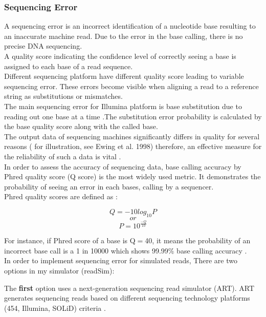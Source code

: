 \documentclass[11pt,a4paper]{report}
\begin{document}
 

\subsubsection{Sequencing Error} \label{Sequencing Error}
 

A sequencing error is an incorrect identification of a nucleotide base resulting 
to an inaccurate machine read. Due to the error in the base calling, there is no 
precise DNA sequencing. \\
A quality score indicating the confidence level of correctly seeing a base is 
assigned to each base of a read sequence.\\
Different sequencing platform have different quality score leading to variable 
sequencing error. These errors become visible when aligning a read to a reference 
string as substitutions or mismatches.\\
The main sequencing error for Illumina platform is base substitution due to 
reading out one base at a time \cite{art}.The substitution error probability is 
calculated by the base quality score along with the called base.\\

The output data of sequencing machines significantly differs in quality for 
several reasons ( for illustration, see Ewing et al. 1998) therefore, an effective 
measure for the reliability of such a data is vital \cite{phred1}.\\

In order to assess the accuracy of sequencing data, base calling accuracy by Phred 
quality score (Q score) is the most widely used metric. It demonstrates the probability 
of seeing an error in each bases, calling by a sequencer.\\

Phred quality scores are defined as \cite{phred2}:

$$ Q = -10  log_{10}P   $$
$$  or $$
$$ P = 10 ^ { \frac{-Q}{ 10 } } $$

For instance, if Phred score of a base is Q$=$40, it means the probability of an 
incorrect base call is a 1 in 10000 which shows 99.99\% base calling accuracy 
\cite{IlluminaPhred}. \\  

In order to implement sequencing error for simulated reads, There are two
options in my simulator (readSim):

The \textbf{first} option uses a next-generation sequencing read simulator (ART). 
ART generates sequencing reads based on different sequencing technology 
platforms (454, Illumina, SOLiD) criteria \cite{art}.
\end{document}
